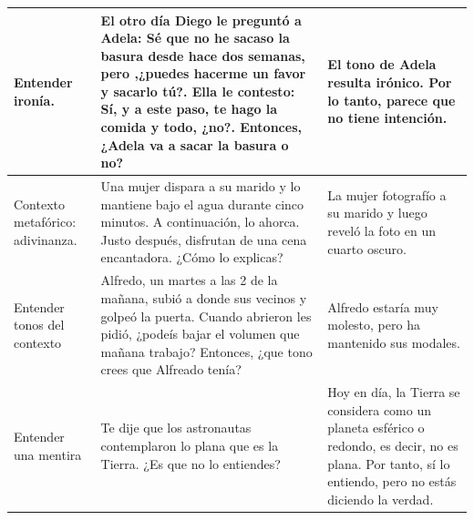 \begin{table}[htbp]
\begin{tabularx}{\textwidth}{|X|X|X|}
    \hline
    Entender ironía. & El otro día Diego le preguntó a Adela: Sé que no he sacaso la basura desde hace dos semanas, pero ,¿puedes hacerme un favor y sacarlo tú?. Ella le contesto: Sí, y a este paso, te hago la comida y todo, ¿no?. Entonces, ¿Adela va a sacar la basura o no?  & El tono de Adela resulta irónico. Por lo tanto, parece que no tiene intención. \\
    \hline
    Contexto metafórico: adivinanza. & Una mujer dispara a su marido y lo mantiene bajo el agua durante cinco minutos. A continuación, lo ahorca. Justo después, disfrutan de una cena encantadora. ¿Cómo lo explicas?  & La mujer fotografío a su marido y luego reveló la foto en un cuarto oscuro. \\
    \hline
    Entender tonos del contexto & Alfredo, un martes a las 2 de la mañana, subió a donde sus vecinos y golpeó la puerta. Cuando abrieron les pidió, ¿podeís bajar el volumen que mañana trabajo? Entonces, ¿que tono crees que Alfreado tenía?  & Alfredo estaría muy molesto, pero ha mantenido sus modales. \\
    \hline
    Entender una mentira & Te dije que los astronautas contemplaron lo plana que es la Tierra. ¿Es que no lo entiendes?  & Hoy en día, la Tierra se considera como un planeta esférico o redondo, es decir, no es plana. Por tanto, sí lo entiendo, pero no estás diciendo la verdad. \\
    \hline
  \end{tabularx}
\end{table}

